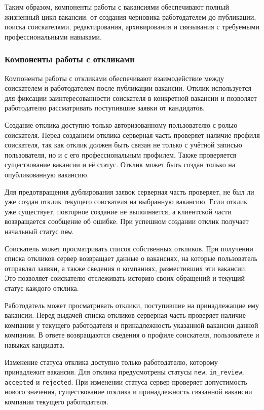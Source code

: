 Таким образом, компоненты работы с вакансиями обеспечивают полный жизненный цикл вакансии: от создания черновика работодателем до публикации, поиска соискателями, редактирования, архивирования и связывания с требуемыми профессиональными навыками.

\subsubsection{Компоненты работы с откликами}

Компоненты работы с откликами обеспечивают взаимодействие между соискателем и работодателем после публикации вакансии. Отклик используется для фиксации заинтересованности соискателя в конкретной вакансии и позволяет работодателю рассматривать поступившие заявки от кандидатов.

Создание отклика доступно только авторизованному пользователю с ролью соискателя. Перед созданием отклика серверная часть проверяет наличие профиля соискателя, так как отклик должен быть связан не только с учётной записью пользователя, но и с его профессиональным профилем. Также проверяется существование вакансии и её статус. Отклик может быть создан только на опубликованную вакансию.

Для предотвращения дублирования заявок серверная часть проверяет, не был ли уже создан отклик текущего соискателя на выбранную вакансию. Если отклик уже существует, повторное создание не выполняется, а клиентской части возвращается сообщение об ошибке. При успешном создании отклик получает начальный статус \texttt{new}.

Соискатель может просматривать список собственных откликов. При получении списка откликов сервер возвращает данные о вакансиях, на которые пользователь отправлял заявки, а также сведения о компаниях, разместивших эти вакансии. Это позволяет соискателю отслеживать историю своих обращений и текущий статус каждого отклика.

Работодатель может просматривать отклики, поступившие на принадлежащие ему вакансии. Перед выдачей списка откликов серверная часть проверяет наличие компании у текущего работодателя и принадлежность указанной вакансии данной компании. В ответе возвращаются сведения о профиле соискателя, пользователе и навыках кандидата.

Изменение статуса отклика доступно только работодателю, которому принадлежит вакансия. Для отклика предусмотрены статусы \texttt{new}, \texttt{in\_review}, \texttt{accepted} и \texttt{rejected}. При изменении статуса сервер проверяет допустимость нового значения, существование отклика и принадлежность связанной вакансии компании текущего работодателя.

